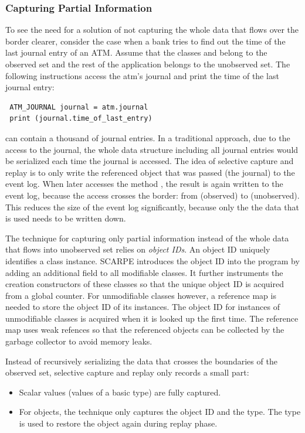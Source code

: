 \subsubsection{Capturing Partial Information}
To see the need for a solution of not capturing the whole data that flows over the border clearer, consider the case when a bank tries to find out the time of the last journal entry of an ATM. Assume that the classes  and  belong to the observed set and the rest of the application belongs to the unobserved set. The following instructions access the atm's journal and print the time of the last journal entry:

\javalisting
\begin{lstlisting}
 ATM_JOURNAL journal = atm.journal
 print (journal.time_of_last_entry)
\end{lstlisting}

 can contain a thousand of journal entries. In a traditional approach, due to the access to the journal, the whole data structure including all journal entries would be serialized each time the journal is accessed. The idea of selective capture and replay is to only write the referenced object that was passed (the journal) to the event log. When later  accesses the method , the result is again written to the event log, because the access crosses the border: from  (observed) to  (unobserved). This reduces the size of the event log significantly, because only the the data that is used needs to be written down.

The technique for capturing only partial information instead of the whole data that flows into unobserved set relies on \emph{object IDs}. An object ID uniquely identifies a class instance. SCARPE introduces the object ID into the program by adding an additional field to all modifiable classes. It further instruments the creation constructors of these classes so that the unique object ID is acquired from a global counter. For unmodifiable classes however, a reference map is needed to store the object ID of its instances. The object ID for instances of unmodifiable classes is acquired when it is looked up the first time. The reference map uses weak refences so that the referenced objects can be collected by the garbage collector to avoid memory leaks.

Instead of recursively serializing the data that crosses the boundaries of the observed set, selective capture and replay only records a small part:
\begin{itemize}
 \item Scalar values (values of a basic type) are fully captured.
 \item For objects, the technique only captures the object ID and the type. The type is used to restore the object again during replay phase.
\end{itemize}

